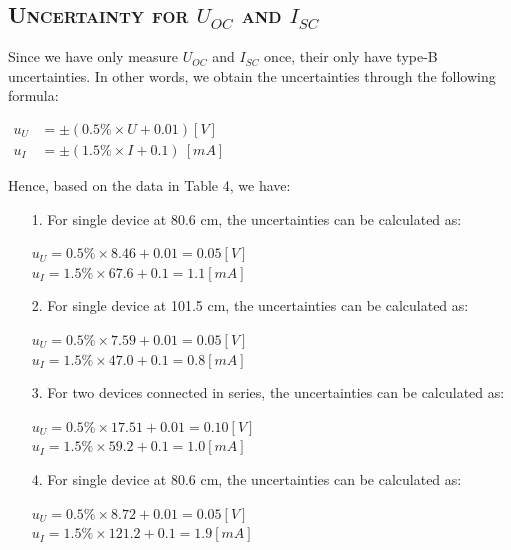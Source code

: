 \documentclass[a4paper,12pt]{article}
\begin{document}
\begin{appendices}
\subsection{\textsc{Uncertainty for $U_{OC}$ and $I_{SC}$}}
Since we have only measure $U_{OC}$ and $I_{SC}$ once, their only have type-B uncertainties. In other words, we obtain the uncertainties through the following formula:
\begin{center}
$\begin{aligned} u_{U} &=\pm(0.5 \% \times U+0.01)[V] \\ u_{I} &=\pm(1.5 \% \times I+0.1)~[mA] \end{aligned}$
\end{center}
Hence, based on the data in Table 4, we have:
\begin{itemize}
\item[1.] For single device at 80.6 cm, the uncertainties can be calculated as:
				\begin{center}
				$ u_U = 0.5\% \times 8.46 + 0.01 = 0.05 [V] $ \\
				$ u_I = 1.5\% \times 67.6 + 0.1 = 1.1 [mA] $
				\end{center}
\item[2.] For single device at 101.5 cm, the uncertainties can be calculated as:
				\begin{center}
				$ u_U = 0.5\% \times 7.59 + 0.01 = 0.05 [V] $ \\
				$ u_I = 1.5\% \times 47.0 + 0.1 = 0.8 [mA] $
				\end{center}
\item[3.] For two devices connected in series, the uncertainties can be calculated as:
				\begin{center}
				$ u_U = 0.5\% \times 17.51 + 0.01 = 0.10 [V] $ \\
				$ u_I = 1.5\% \times 59.2 + 0.1 = 1.0 [mA] $
				\end{center}
\item[4.] For single device at 80.6 cm, the uncertainties can be calculated as:
				\begin{center}
				$ u_U = 0.5\% \times 8.72 + 0.01 = 0.05 [V] $ \\
				$ u_I = 1.5\% \times 121.2 + 0.1 = 1.9 [mA] $
				\end{center}
\end{itemize}


\end{appendices}
\end{document}
